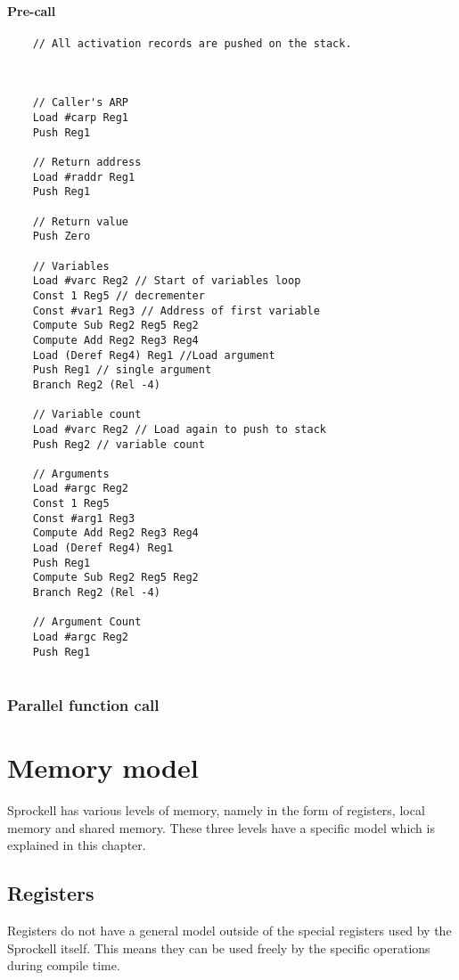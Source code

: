 \documentclass[10pt,a4paper]{report}
\begin{document}
\paragraph{Pre-call}
\begin{verbatim}
	// All activation records are pushed on the stack.
		
	 
	
	// Caller's ARP
	Load #carp Reg1
	Push Reg1 
	
	// Return address
	Load #raddr Reg1	
	Push Reg1
	
	// Return value
	Push Zero
	
	// Variables
	Load #varc Reg2 // Start of variables loop
	Const 1 Reg5 // decrementer
	Const #var1 Reg3 // Address of first variable
	Compute Sub Reg2 Reg5 Reg2
	Compute Add Reg2 Reg3 Reg4
	Load (Deref Reg4) Reg1 //Load argument
	Push Reg1 // single argument
	Branch Reg2 (Rel -4)
	
	// Variable count
	Load #varc Reg2 // Load again to push to stack
	Push Reg2 // variable count
	
	// Arguments
	Load #argc Reg2
	Const 1 Reg5
	Const #arg1 Reg3
	Compute Add Reg2 Reg3 Reg4
	Load (Deref Reg4) Reg1
	Push Reg1
	Compute Sub Reg2 Reg5 Reg2 
	Branch Reg2 (Rel -4)
	
	// Argument Count
	Load #argc Reg2
	Push Reg1
	
\end{verbatim}



\subsubsection{Parallel function call}






\section{Memory model}
Sprockell has various levels of memory, namely in the form of registers, local memory and shared memory. These three levels have a specific model which is explained in this chapter.

\subsection{Registers}
Registers do not have a general model outside of the special registers used by the Sprockell itself. This means they can be used freely by the specific operations during compile time.
\end{document}
